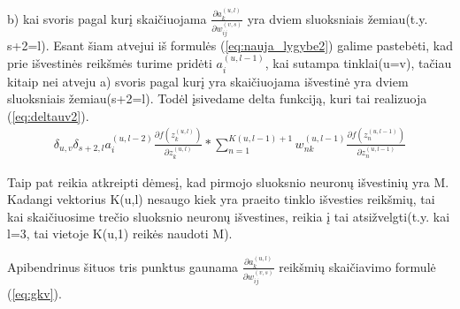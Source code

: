   b) kai svoris pagal kurį skaičiuojama \begin{math}\frac{\partial a_k^{(u, l)}}{\partial w_{ij}^{(v,s)}}\end{math} yra dviem sluoksniais žemiau(t.y. s+2=l).
  Esant šiam atvejui iš formulės (\ref{eq:nauja_lygybe2}) galime pastebėti, kad prie išvestinės reikšmės turime pridėti \begin{math}a_i^{(u,l-1)}\end{math}, kai sutampa tinklai(u=v), tačiau kitaip nei atveju a) svoris pagal kurį yra skaičiuojama išvestinė yra dviem sluoksniais žemiau(s+2=l). Todėl įsivedame delta funkciją, kuri tai realizuoja (\ref{eq:deltauv2}).
  \begin{equation}\label{eq:deltauv2}
    \begin{aligned}
      \delta_{u,v}\delta_{s+2,l}a_i^{(u,l-2)}\frac{\partial f(z_k^{(u,l)})}{\partial z_k^{(u,l)}}*
        \sum_{n=1}^{K(u,l-1)+1} w_{nk}^{(u,l-1)} \frac{\partial f(z_n^{(u,l-1)})}{\partial z_n^{(u,l-1)}}
    \end{aligned}
  \end{equation}

  Taip pat reikia atkreipti dėmesį, kad pirmojo sluoksnio neuronų išvestinių yra M. Kadangi vektorius K(u,l) nesaugo kiek yra praeito tinklo išvesties reikšmių, tai kai skaičiuosime trečio sluoksnio neuronų išvestines, reikia į tai atsižvelgti(t.y. kai l=3, tai vietoje K(u,1) reikės naudoti M).


Apibendrinus šituos tris punktus gaunama \begin{math}\frac{\partial a_k^{(u,l)}}{\partial w_{ij}^{(v,s)}}\end{math} reikšmių skaičiavimo formulė (\ref{eq:gkv}).



